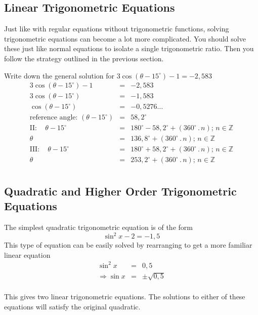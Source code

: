 \subsection{Linear Trigonometric Equations}
Just like with regular equations without trigonometric functions, solving trigonometric equations can become a lot more complicated. You should solve these just like normal equations to isolate a single trigonometric ratio. Then you follow the strategy outlined in the previous section.

\begin{wex}{}
{%
Write down the general solution for $3\cos(\theta - 15^\circ)-1 = -2,583$\\
}
{%
\begin{eqnarray*} 
3\cos(\theta-15^{\circ})-1 &=& -2,583 \\
3\cos(\theta-15^{\circ}) &=& -1,583\\ 
\cos(\theta-15^{\circ}) &=& -0,5276\ldots\\
\mbox{reference angle: }(\theta-15^{\circ}) &=& 58,2^{\circ}\\ 
\mathrm{II:} \quad \theta-15^{\circ}&=&180^{\circ}-58,2^{\circ}+(360^{\circ}\,.\, n) \mbox{; }n\in\mathbb{Z} \\ 
\theta&=&136,8^{\circ}+(360^{\circ}\,.\, n)\mbox{; } n \in \mathbb{Z} \\ 
\mathrm{III:} \quad \theta-15^{\circ}&=&180^{\circ}+58,2^{\circ}+(360^{\circ}\,.\, n) \mbox{; } n\in\mathbb{Z} \\ 
\theta&=&253,2^{\circ}+(360^{\circ}\,.\, n) \mbox{; } n \in \mathbb{Z} \\ 
\end{eqnarray*}
}
\end{wex}

\subsection{Quadratic and Higher Order Trigonometric Equations}
The simplest quadratic trigonometric equation is of the form
\[ \sin^2x-2=-1,5 \]
This type of equation can be easily solved by rearranging to get a more familiar linear equation
\begin{eqnarray*}
\sin^2x&=&0,5 \\
\Rightarrow \sin x&=&\pm\sqrt{0,5} \\
\end{eqnarray*}

This gives two linear trigonometric equations. The solutions to either of these equations will satisfy the original quadratic. 


